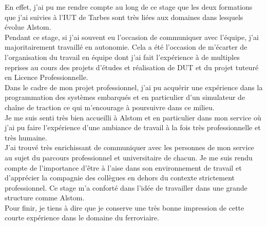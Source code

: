 \documentclass[a4paper]{report}
\begin{document}
		En effet, j'ai pu me rendre compte au long de ce stage que les deux formations que j'ai suivies à l'IUT de Tarbes sont très liées aux domaines dans lesquels évolue Alstom. \\
		
		Pendant ce stage, si j'ai souvent eu l'occasion de communiquer avec l'équipe, j'ai majoritairement travaillé en autonomie. Cela a été l'occasion de m'écarter de l'organisation du travail en équipe dont j'ai fait l'expérience à de multiples reprises au cours des projets d'études et réalisation de DUT et du projet tuteuré en Licence Professionnelle.\\
	
		Dans le cadre de mon projet professionnel, j'ai pu acquérir une expérience dans la programmation des systèmes embarqués et en particulier d'un simulateur de chaîne de traction ce qui m'encourage à poursuivre dans ce milieu.\\
		
		Je me suis senti très bien accueilli à Alstom et en particulier dans mon service où j'ai pu faire l'expérience d'une ambiance de travail à la fois très professionnelle et très humaine.\\
		
		J'ai trouvé très enrichissant de communiquer avec les personnes de mon service au sujet du parcours professionnel et universitaire de chacun. Je me suis rendu compte de l'importance d'être à l'aise dans son environnement de travail et d'apprécier la compagnie des collègues en dehors du contexte strictement professionnel.
		Ce stage m'a conforté dans l'idée de travailler dans une grande structure comme Alstom.\\
		
		Pour finir, je tiens à dire que je conserve une très bonne impression de cette courte expérience dans le domaine du ferroviaire.\\

	 
	
\end{document}
